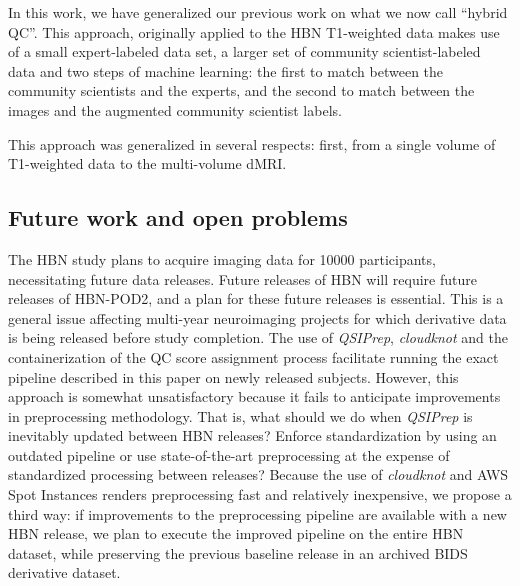 \documentclass[fleqn,10pt]{wlscirep}
\begin{document}
In this work, we have generalized our previous work on what we now call ``hybrid
QC''. This approach, originally applied to the HBN T1-weighted data
\cite{keshavan2019-er} makes use of a small expert-labeled data set, a larger
set of community scientist-labeled data and two steps of machine learning: the
first to match between the community scientists and the experts, and the second
to match between the images and the augmented community scientist labels.

This approach was generalized in several respects: first, from a single volume
of T1-weighted data to the multi-volume dMRI.



\subsection*{Future work and open problems}

The HBN study plans to acquire imaging data for \num{10000} participants,
necessitating future data releases. Future releases of HBN will require future
releases of HBN-POD2, and a plan for these future releases is essential. This is
a general issue affecting multi-year neuroimaging projects for which derivative
data is being released before study completion. The use of \emph{QSIPrep},
\emph{cloudknot} and the containerization of the QC score assignment process
facilitate running the exact pipeline described in this paper on newly released
subjects. However, this approach is somewhat unsatisfactory because it fails to
anticipate improvements in preprocessing methodology. That is, what should we do
when \emph{QSIPrep} is inevitably updated between HBN releases? Enforce
standardization by using an outdated pipeline or use state-of-the-art
preprocessing at the expense of standardized processing between releases?
Because the use of \emph{cloudknot} and AWS Spot Instances renders preprocessing
fast and relatively inexpensive, we propose a third way: if improvements to the
preprocessing pipeline are available with a new HBN release, we plan to execute
the improved pipeline on the entire HBN dataset, while preserving the previous
baseline release in an archived BIDS derivative dataset.
\end{document}

